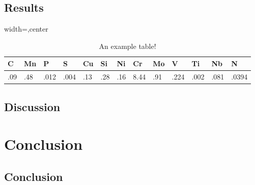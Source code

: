 \documentclass[eyerest, skincolourgold]{Styles/_myClass} %
\begin{document}
\kant[16]
\section{Results} 
\kant[17-18]

\begin{table}[hb!]
\caption{An example table!}
\centering
\begin{adjustbox}{width=\columnwidth,center}
\begin{tabular}{lllllllllllll}
\toprule
C   & Mn  & P    & S    & Cu  & Si  & Ni  & Cr   & Mo  & V    & Ti   & Nb   & N     \\\midrule
.09 & .48 & .012 & .004 & .13 & .28 & .16 & 8.44 & .91 & .224 & .002 & .081 & .0394 \\\bottomrule
\end{tabular}
\end{adjustbox}
\label{tab:example}
\end{table}

\kant[19-20]
\section{Discussion}
\kant[21-25]

\chapter{Conclusion}

\kant[26]
\section{Conclusion}
\kant[27-31]


\clearpage
\printbibliography[] %
\label{mylastpage}
\end{document}
